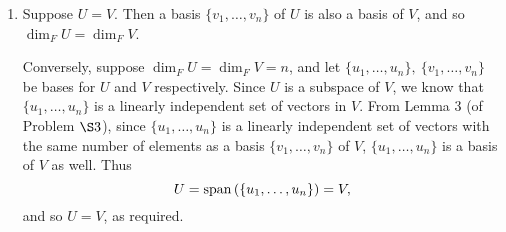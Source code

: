 \documentclass{homework}
\begin{document}
\begin{solution}
\begin{enumerate}[label=(\alph*)]
    \item Suppose $U=V$. Then a basis $\{ v_1,\ldots,v_n \}$ of $U$ is also a basis of $V$, and so
      $\dim_F{U}=\dim_F{V}$.

      Conversely, suppose $\dim_F{U}=\dim_F{V}=n$, and let $\{ u_1,\ldots,u_n \},\ \{ v_1,\ldots,v_n
      \}$ be bases for $U$ and $V$ respectively. Since $U$ is a subspace of $V$, we know that $\{
    u_1,\ldots,u_n \}$ is a linearly independent set of vectors in $V$. From Lemma 3 (of Problem
    $\S 3$), since $\{ u_1,\ldots,u_n \}$ is a linearly independent set of vectors with the same
    number of elements as a basis $\{ v_1,\ldots,v_n \}$ of $V$, $\{ u_1,\ldots,u_n \}$ is a basis
    of $V$ as well. Thus \[
      U=\operatorname{span}{(\{ u_1,\ldots,u_n \})}=V
    ,\] and so $U=V$, as required.
  \end{enumerate}
\end{solution}
\end{document}
